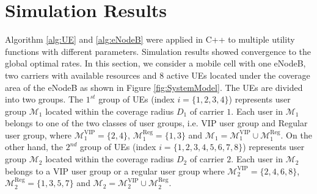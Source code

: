 \documentclass[journal]{IEEEtran} 				\IEEEoverridecommandlockouts 						\usepackage{amsmath,amssymb}
\begin{document}
\section{Simulation Results}\label{sec:sim}
Algorithm \ref{alg:UE} and \ref{alg:eNodeB} were applied in C++ to multiple utility functions with different parameters. Simulation results showed convergence to the global optimal rates. In this section, we consider a mobile cell with one eNodeB, two carriers with available resources and $8$ active UEs located under the coverage area of the eNodeB as shown in Figure \ref{fig:SystemModel}. The UEs are divided into two groups. The $1^{st}$ group of UEs (index $i=\{1,2,3,4\}$) represents user group $\mathcal{M}_1$ located within the coverage radius $D_1$ of carrier $1$. Each user in $\mathcal{M}_1$ belongs to one of the two classes of user groups, i.e. VIP user group and Regular user group, where $\mathcal{M}_1^{\text{VIP}}=\{2,4\}$, $\mathcal{M}_1^{\text{Reg}}=\{1,3\}$ and $\mathcal{M}_1=\mathcal{M}_1^{\text{VIP}}\cup \mathcal{M}_1^{\text{Reg}}$. On the other hand, the $2^{nd}$ group of UEs (index $i=\{1,2,3,4,5,6,7,8\}$) represents user group $\mathcal{M}_2$ located within the coverage radius $D_2$ of carrier $2$. Each user in $\mathcal{M}_2$ belongs to a VIP user group or a regular user group where $\mathcal{M}_2^{\text{VIP}}=\{2,4,6,8\}$, $\mathcal{M}_2^{\text{Reg}}=\{1,3,5,7\}$ and $\mathcal{M}_2=\mathcal{M}_2^{\text{VIP}}\cup \mathcal{M}_2^{\text{Reg}}$.
\end{document}
